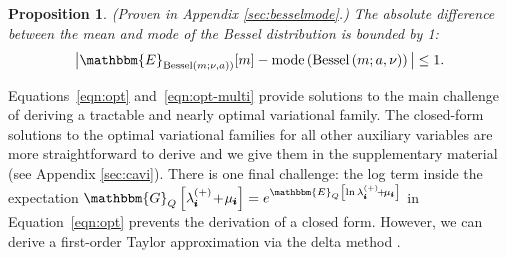 \documentclass[letterpaper]{article}
\newcommand{\Yten}{\pmb{Y}}
\newcommand{\subs}{\pmb{i}}
\newcommand{\wsup}[2]{#1_{\subs}^{(#2)}}
\newcommand{\lamP}{\wsup{\lambda}{+}}
\newcommand{\factori}[1]{\theta^{(#1)}}
\newcommand{\mus}{\mu_{\subs}}
\newcommand{\Bess}[1]{\textup{Bessel}\left( #1 \right)}
\newcommand{\Pois}[1]{\textup{Poisson}\left( #1 \right)}
\newcommand{\Eq}[1]{\mathbbm{E}_Q\left[#1\right]}
\newcommand{\Gq}[1]{\mathbbm{G}_Q\left[#1\right]}
\newcommand{\tp}{\!+\!}
\newtheorem{proposition}{Proposition}
\begin{document}
  \begin{proposition} (Proven in Appendix \ref{sec:besselmode}.) The absolute
  difference between the mean and mode of the Bessel distribution is bounded by
  1:
    \[ \big| \mathbbm{E}_{\Bess{m; \nu, a})}[m]  - \textup{mode} \left(\Bess{m;
    a, \nu} \right) \big|  \leq 1. \]
  \end{proposition}
  
  Equations~\ref{eqn:opt} and~\ref{eqn:opt-multi} provide solutions to the main
  challenge of deriving a tractable and nearly optimal variational family. The
  closed-form solutions to the optimal variational families for all other
  auxiliary variables are more straightforward to derive and we give them in the
  supplementary material (see Appendix \ref{sec:cavi}). There is one final
  challenge: the log term inside the expectation $\Gq{\lamP \tp \mus} =
  e^{\Eq{\ln \lamP \tp \mus}}$ in Equation~\ref{eqn:opt} prevents the derivation
  of a closed form. However, we can derive a first-order Taylor approximation
  via the delta method \citep{ver2012invented}.
  
  
  
  
  
\end{document}

